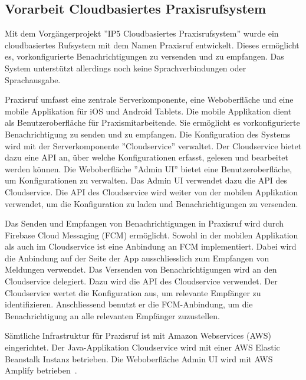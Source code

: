 \subsection{Vorarbeit Cloudbasiertes Praxisrufsystem}

Mit dem Vorgängerprojekt ''IP5 Cloudbasiertes Praxisrufsystem'' wurde ein cloudbasiertes Rufsystem mit dem Namen Praxisruf entwickelt.
Dieses ermöglicht es, vorkonfigurierte Benachrichtigungen zu versenden und zu empfangen.
Das System unterstützt allerdings noch keine Sprachverbindungen oder Sprachausgabe.

Praxisruf umfasst eine zentrale Serverkomponente, eine Weboberfläche und eine mobile Applikation für iOS und Android Tablets.
Die mobile Applikation dient als Benutzeroberfläche für Praxismitarbeitende.
Sie ermöglicht es vorkonfigurierte Benachrichtigung zu senden und zu empfangen.
Die Konfiguration des Systems wird mit der Serverkomponente ''Cloudservice'' verwaltet.
Der Cloudservice bietet dazu eine API an, über welche Konfigurationen erfasst, gelesen und bearbeitet werden können.
Die Weboberfläche ''Admin UI'' bietet eine Benutzeroberfläche, um Konfigurationen zu verwalten.
Das Admin UI verwendet dazu die API des Cloudservice.
Die API des Cloudservice wird weiter von der mobilen Applikation verwendet, um die Konfiguration zu laden und Benachrichtigungen zu versenden.

Das Senden und Empfangen von Benachrichtigungen in Praxisruf wird durch Firebase Cloud Messaging (FCM) ermöglicht.
Sowohl in der mobilen Applikation als auch im Cloudservice ist eine Anbindung an FCM implementiert.
Dabei wird die Anbindung auf der Seite der App ausschliesslich zum Empfangen von Meldungen verwendet.
Das Versenden von Benachrichtigungen wird an den Cloudservice delegiert.
Dazu wird die API des Cloudservice verwendet.
Der Cloudservice wertet die Konfiguration aus, um relevante Empfänger zu identifizieren.
Anschliessend benutzt er die FCM-Anbindung, um die Benachrichtigung an alle relevanten Empfänger zuzustellen.

Sämtliche Infrastruktur für Praxisruf ist mit Amazon Webservices (AWS) eingerichtet.
Der Java-Applikation Cloudservice wird mit einer AWS Elastic Beanstalk Instanz betrieben.
Die Weboberfläche Admin UI wird mit AWS Amplify betrieben~\cite{ip5}.
